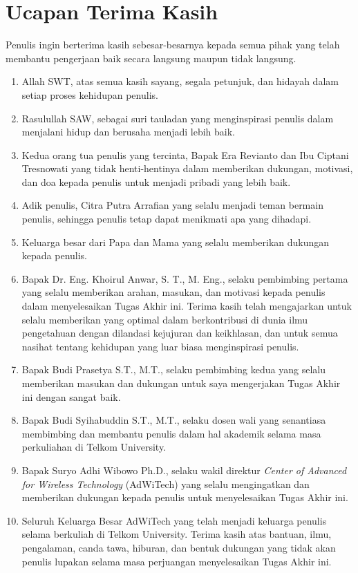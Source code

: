 \chapter*{Ucapan Terima Kasih}
Penulis ingin berterima kasih sebesar-besarnya kepada semua pihak yang telah membantu pengerjaan baik secara langsung maupun tidak langsung.
\begin{enumerate}
	\item Allah SWT, atas semua kasih sayang, segala petunjuk, dan hidayah dalam setiap proses kehidupan penulis.
	\item Rasulullah SAW, sebagai suri tauladan yang menginspirasi penulis dalam menjalani hidup dan berusaha menjadi lebih baik. 
\item Kedua orang tua penulis yang tercinta, Bapak Era Revianto dan Ibu Ciptani Tresnowati yang tidak henti-hentinya dalam memberikan dukungan, motivasi, dan doa kepada penulis untuk menjadi pribadi yang lebih baik.
\item Adik penulis, Citra Putra Arrafian yang selalu menjadi teman bermain penulis, sehingga penulis tetap dapat menikmati apa yang dihadapi.
\item Keluarga besar dari Papa dan Mama yang selalu memberikan dukungan kepada penulis.
\item Bapak Dr. Eng. Khoirul Anwar, S. T., M. Eng., selaku pembimbing pertama yang selalu memberikan arahan, masukan, dan motivasi kepada penulis dalam menyelesaikan Tugas Akhir ini. Terima kasih telah mengajarkan untuk selalu memberikan yang optimal dalam berkontribusi di dunia ilmu pengetahuan dengan dilandasi kejujuran dan keikhlasan, dan untuk semua nasihat tentang kehidupan yang luar biasa menginspirasi penulis.
\item Bapak Budi Prasetya S.T., M.T., selaku pembimbing kedua yang selalu memberikan masukan dan dukungan untuk saya mengerjakan Tugas Akhir ini dengan sangat baik.
\item Bapak Budi Syihabuddin S.T., M.T., selaku dosen wali yang senantiasa membimbing dan membantu penulis dalam hal akademik selama masa perkuliahan di Telkom University.
\item Bapak Suryo Adhi Wibowo Ph.D., selaku wakil direktur \textit{Center of Advanced for Wireless Technology} (AdWiTech) yang selalu mengingatkan dan memberikan dukungan kepada penulis untuk menyelesaikan Tugas Akhir ini.
\item Seluruh Keluarga Besar AdWiTech yang telah menjadi keluarga penulis selama berkuliah di Telkom University. Terima kasih atas bantuan, ilmu, pengalaman, canda tawa, hiburan, dan bentuk dukungan yang tidak akan penulis lupakan selama masa perjuangan menyelesaikan Tugas Akhir ini.

\end{enumerate}
